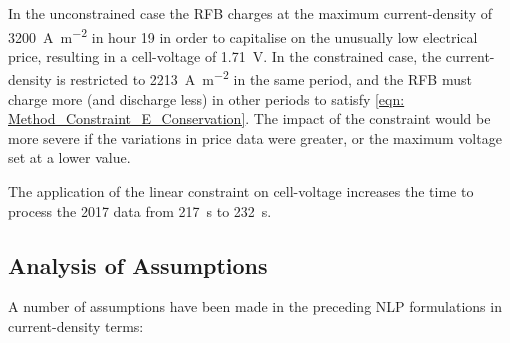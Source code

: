 \documentclass[preprint,3p,review,authoryear,10pt]{elsarticle}
\begin{document}
In the unconstrained case the RFB charges at the maximum current-density of \SI{3200}{\ampere\per\square\meter} in hour 19 in order to capitalise on the unusually low electrical price, resulting in a cell-voltage of \SI{1.71}{\volt}. In the constrained case, the current-density is restricted to \SI{2213}{\ampere\per\square\meter} in the same period, and the RFB must charge more (and discharge less) in other periods to satisfy \cref{eqn: Method_Constraint_E_Conservation}. The impact of the constraint would be more severe if the variations in price data were greater, or the maximum voltage set at a lower value.

The application of the linear constraint on cell-voltage increases the time to process the 2017 data from \SI{217}{\second} to \SI{232}{\second}.

\subsection{Analysis of Assumptions}
\label{analysis_of_assumptions}
A number of assumptions have been made in the preceding NLP formulations in current-density terms:
\end{document}
